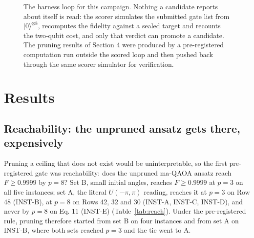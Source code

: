 \documentclass[11pt]{article}
\begin{document}
\begin{figure}[t]
\centering
{}
\caption{The harness loop for this campaign. Nothing a candidate reports about itself is read: the scorer simulates the submitted gate list from $|0\rangle^{\otimes 8}$, recomputes the fidelity against a sealed target and recounts the two-qubit cost, and only that verdict can promote a candidate. The pruning results of Section 4 were produced by a pre-registered computation run outside the scored loop and then pushed back through the same scorer simulator for verification.}
\label{fig:loop}
\end{figure}

\section{Results}

\subsection{Reachability: the unpruned ansatz gets there, expensively}

Pruning a ceiling that does not exist would be uninterpretable, so the first pre-registered gate was reachability: does the unpruned ma-QAOA ansatz reach $F \geq 0.9999$ by $p = 8$? Set B, small initial angles, reaches $F \geq 0.9999$ at $p = 3$ on all five instances; set A, the literal $U(-\pi,\pi)$ reading, reaches it at $p = 3$ on Row 48 (INST-B), at $p = 8$ on Rows 42, 32 and 30 (INST-A, INST-C, INST-D), and never by $p = 8$ on Eq. 11 (INST-E) (Table~\ref{tab:reach}). Under the pre-registered rule, pruning therefore started from set B on four instances and from set A on INST-B, where both sets reached $p = 3$ and the tie went to A.
\end{document}
